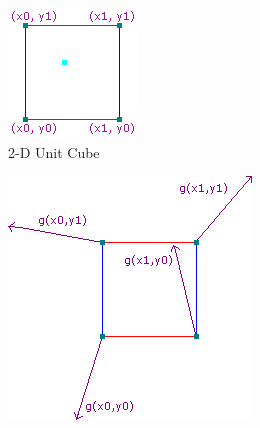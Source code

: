 \begin{figure}
    \centering
    \begin{subfigure}[b]{0.29\textwidth}
        \centering
        \includegraphics[width=\textwidth]{figures/body/methodology/perlin_noise_unit_cube.png}
        \caption{2-D Unit Cube}
        \label{figure:perlin_noise_unit_cube}
    \end{subfigure}
    \begin{subfigure}[b]{0.29\textwidth}
        \centering
        \includegraphics[width=\textwidth]{figures/body/methodology/perlin_noise_gradient_vector.png}

\end{subfigure}
\end{figure}

